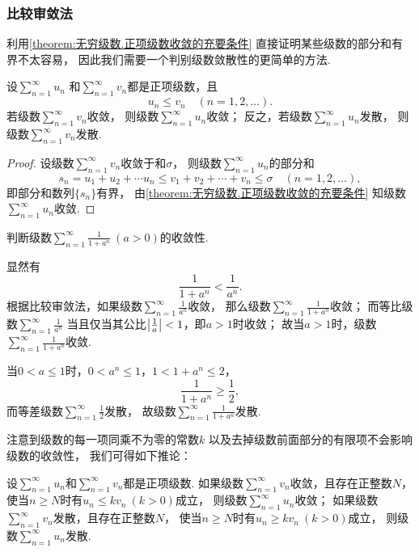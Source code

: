 \subsubsection{比较审敛法}
利用\cref{theorem:无穷级数.正项级数收敛的充要条件} 直接证明某些级数的部分和有界不太容易，
因此我们需要一个判别级数敛散性的更简单的方法.

\begin{theorem}[比较审敛法]\label{theorem:无穷级数.正项级数的比较审敛法}
设\(\sum\limits_{n=1}^\infty u_n\)
和\(\sum\limits_{n=1}^\infty v_n\)都是正项级数，且\[
	u_n \leq v_n
	\quad(n=1,2,\dotsc).
\]
若级数\(\sum\limits_{n=1}^\infty v_n\)收敛，
则级数\(\sum\limits_{n=1}^\infty u_n\)收敛；
反之，若级数\(\sum\limits_{n=1}^\infty u_n\)发散，
则级数\(\sum\limits_{n=1}^\infty v_n\)发散.
\begin{proof}
设级数\(\sum\limits_{n=1}^\infty v_n\)收敛于和\(\sigma\)，
则级数\(\sum\limits_{n=1}^\infty u_n\)的部分和\[
	s_n = u_1 + u_2 + \dotsb u_n
	\leq
	v_1 + v_2 + \dotsb + v_n \leq \sigma
	\quad(n=1,2,\dotsc),
\]
即部分和数列\(\{s_n\}\)有界，
由\cref{theorem:无穷级数.正项级数收敛的充要条件} 知级数\(\sum\limits_{n=1}^\infty u_n\)收敛.
\end{proof}
\end{theorem}

\begin{example}
判断级数\(\sum\limits_{n=1}^\infty \frac{1}{1+a^n}\ (a>0)\)的收敛性.
\begin{solution}
显然有\[
	\frac{1}{1+a^n} < \frac{1}{a^n}.
\]
根据比较审敛法，如果级数\(\sum\limits_{n=1}^\infty \frac{1}{a^n}\)收敛，
那么级数\(\sum\limits_{n=1}^\infty \frac{1}{1+a^n}\)收敛；
而等比级数\(\sum\limits_{n=1}^\infty \frac{1}{a^n}\)
当且仅当其公比\(\abs{\frac{1}{a}} < 1\)，即\(a > 1\)时收敛；
故当\(a > 1\)时，级数\(\sum\limits_{n=1}^\infty \frac{1}{1+a^n}\)收敛.

当\(0 < a \leq 1\)时，\(0 < a^n \leq 1\)，\(1 < 1 + a^n \leq 2\)，\[
	\frac{1}{1+a^n} \geq \frac{1}{2},
\]
而等差级数\(\sum\limits_{n=1}^\infty \frac{1}{2}\)发散，
故级数\(\sum\limits_{n=1}^\infty \frac{1}{1+a^n}\)发散.
\end{solution}
\end{example}

注意到级数的每一项同乘不为零的常数\(k\)
以及去掉级数前面部分的有限项不会影响级数的收敛性，
我们可得如下推论：
\begin{corollary}\label{theorem:无穷级数.正项级数的比较审敛法的推论}
设\(\sum\limits_{n=1}^\infty u_n\)和\(\sum\limits_{n=1}^\infty v_n\)都是正项级数.
如果级数\(\sum\limits_{n=1}^\infty v_n\)收敛，且存在正整数\(N\)，
使当\(n \geq N\)时有\(u_n \leq k v_n\ (k > 0)\)成立，
则级数\(\sum\limits_{n=1}^\infty u_n\)收敛；
如果级数\(\sum\limits_{n=1}^\infty v_n\)发散，且存在正整数\(N\)，
使当\(n \geq N\)时有\(u_n \geq k v_n\ (k > 0)\)成立，
则级数\(\sum\limits_{n=1}^\infty u_n\)发散.
\end{corollary}


